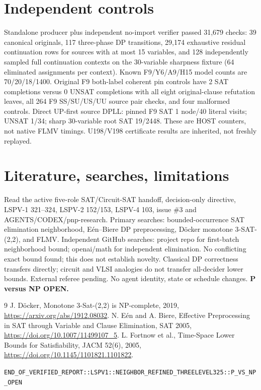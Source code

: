 \documentclass[11pt]{article}
\begin{document}
\section{Independent controls}
Standalone producer plus independent no-import verifier passed 31,679 checks: 39 canonical originals, 117 three-phase DP transitions, 29,174 exhaustive residual continuation rows for sources with at most 15 variables, and 128 independently sampled full continuation contexts on the 30-variable sharpness fixture (64 eliminated assignments per context). Known F9/Y6/A9/H15 model counts are 70/20/18/1400. Original F9 both-label coherent pin controls have 2 SAT completions versus 0 UNSAT completions with all eight original-clause refutation leaves, all 264 F9 SS/SU/US/UU source pair checks, and four malformed controls. Direct UP-first source DPLL: pinned F9 SAT 1 node/40 literal visits; UNSAT 1/34; sharp 30-variable root SAT 19/2448. These are HOST counters, not native FLMV timings. U198/V198 certificate results are inherited, not freshly replayed.
\section{Literature, searches, limitations}
Read the active five-role SAT/Circuit-SAT handoff, decision-only directive, LSPV-1 321--324, LSPV-2 152/153, LSPV-4 103, issue \#3 and AGENTS/CODEX/pnp-research. Primary searches: bounded-occurrence SAT elimination neighborhood, E\'en--Biere DP preprocessing, D\"ocker monotone 3-SAT-(2,2), and FLMV. Independent GitHub searches: project repo for first-batch neighborhood bound; openai/math for independent elimination. No conflicting exact bound found; this does not establish novelty. Classical DP correctness transfers directly; circuit and VLSI analogies do not transfer all-decider lower bounds. External referee pending. No agent identity, state or schedule changes. \textbf{P versus NP OPEN.}
\begin{thebibliography}{9}
 J. D\"ocker, Monotone 3-Sat-(2,2) is NP-complete, 2019, \url{https://arxiv.org/abs/1912.08032}.
 N. E\'en and A. Biere, Effective Preprocessing in SAT through Variable and Clause Elimination, SAT 2005, \url{https://doi.org/10.1007/11499107_5}.
 L. Fortnow et al., Time-Space Lower Bounds for Satisfiability, JACM 52(6), 2005, \url{https://doi.org/10.1145/1101821.1101822}.
\end{thebibliography}
\noindent\texttt{END\_OF\_VERIFIED\_REPORT::LSPV1::NEIGHBOR\_REFINED\_THREELEVEL325::P\_VS\_NP\_OPEN}
\end{document}
